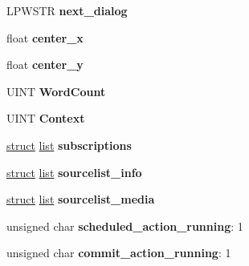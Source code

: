 \begin{DoxyCompactItemize}
\item 
\mbox{\label{structtag_m_s_i_p_a_c_k_a_g_e_a6250bcc2d1abe00ba549c1f9fa9bbd6f}} 
L\+P\+W\+S\+TR {\bfseries next\+\_\+dialog}
\item 
\mbox{\label{structtag_m_s_i_p_a_c_k_a_g_e_af046bf4778627bd5ae9c1ea637b8f900}} 
float {\bfseries center\+\_\+x}
\item 
\mbox{\label{structtag_m_s_i_p_a_c_k_a_g_e_a172ac5d931bbe7386d9ee58e3c939bff}} 
float {\bfseries center\+\_\+y}
\item 
\mbox{\label{structtag_m_s_i_p_a_c_k_a_g_e_a2f92de2ea181463b84ecc5ae42589ec8}} 
U\+I\+NT {\bfseries Word\+Count}
\item 
\mbox{\label{structtag_m_s_i_p_a_c_k_a_g_e_a9f3691aac8990541610174320ba30d85}} 
U\+I\+NT {\bfseries Context}
\item 
\mbox{\label{structtag_m_s_i_p_a_c_k_a_g_e_a1ec62793100f4068cbb9b623b441eb5b}} 
\hyperlink{interfacestruct}{struct} \hyperlink{classlist}{list} {\bfseries subscriptions}
\item 
\mbox{\label{structtag_m_s_i_p_a_c_k_a_g_e_af96eb8f0c0e776380dd954abd0e18361}} 
\hyperlink{interfacestruct}{struct} \hyperlink{classlist}{list} {\bfseries sourcelist\+\_\+info}
\item 
\mbox{\label{structtag_m_s_i_p_a_c_k_a_g_e_aa76e6f567363d4419ef7bad9590406f9}} 
\hyperlink{interfacestruct}{struct} \hyperlink{classlist}{list} {\bfseries sourcelist\+\_\+media}
\item 
\mbox{\label{structtag_m_s_i_p_a_c_k_a_g_e_ad09fe6c6cf47a37b881f2f177d89a555}} 
unsigned char {\bfseries scheduled\+\_\+action\+\_\+running}\+: 1
\item 
\mbox{\label{structtag_m_s_i_p_a_c_k_a_g_e_a378dcecd52ec4ece5a69e578a81df126}} 
unsigned char {\bfseries commit\+\_\+action\+\_\+running}\+: 1

\end{DoxyCompactItemize}
